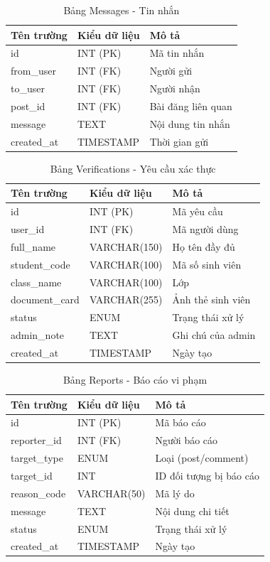 \documentclass[a4paper,12pt]{report}
\begin{document}
\begin{table}[H]
\centering
\caption{Bảng Messages - Tin nhắn}
\begin{tabular}{|l|l|l|}
\hline
\textbf{Tên trường} & \textbf{Kiểu dữ liệu} & \textbf{Mô tả} \\
\hline
id & INT (PK) & Mã tin nhắn \\
from\_user & INT (FK) & Người gửi \\
to\_user & INT (FK) & Người nhận \\
post\_id & INT (FK) & Bài đăng liên quan \\
message & TEXT & Nội dung tin nhắn \\
created\_at & TIMESTAMP & Thời gian gửi \\
\hline
\end{tabular}
\end{table}

\begin{table}[H]
\centering
\caption{Bảng Verifications - Yêu cầu xác thực}
\begin{tabular}{|l|l|l|}
\hline
\textbf{Tên trường} & \textbf{Kiểu dữ liệu} & \textbf{Mô tả} \\
\hline
id & INT (PK) & Mã yêu cầu \\
user\_id & INT (FK) & Mã người dùng \\
full\_name & VARCHAR(150) & Họ tên đầy đủ \\
student\_code & VARCHAR(100) & Mã số sinh viên \\
class\_name & VARCHAR(100) & Lớp \\
document\_card & VARCHAR(255) & Ảnh thẻ sinh viên \\
status & ENUM & Trạng thái xử lý \\
admin\_note & TEXT & Ghi chú của admin \\
created\_at & TIMESTAMP & Ngày tạo \\
\hline
\end{tabular}
\end{table}

\begin{table}[H]
\centering
\caption{Bảng Reports - Báo cáo vi phạm}
\begin{tabular}{|l|l|l|}
\hline
\textbf{Tên trường} & \textbf{Kiểu dữ liệu} & \textbf{Mô tả} \\
\hline
id & INT (PK) & Mã báo cáo \\
reporter\_id & INT (FK) & Người báo cáo \\
target\_type & ENUM & Loại (post/comment) \\
target\_id & INT & ID đối tượng bị báo cáo \\
reason\_code & VARCHAR(50) & Mã lý do \\
message & TEXT & Nội dung chi tiết \\
status & ENUM & Trạng thái xử lý \\
created\_at & TIMESTAMP & Ngày tạo \\
\hline
\end{tabular}
\end{table}
\end{document}
